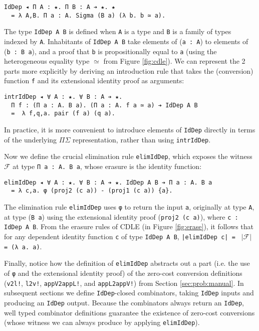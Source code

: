 \documentclass[acmsmall]{acmart}\settopmatter{}
\newcommand{\refsec}[1]{Section \ref{sec:#1}}
\newcommand{\reffig}[1]{Figure \ref{fig:#1}}
\begin{document}
\begin{verbatim}
IdDep ◂ Π A : ★. Π B : A ➔ ★. ★
  = λ A,B. Π a : A. Sigma (B a) (λ b. b ≃ a).
\end{verbatim}
The type \verb;IdDep A B; is defined when \verb;A; is a type and
\verb;B; is a family of types indexed by \verb;A;. Inhabitants of
\verb;IdDep A B; take elements of (\verb;a : A;) to elements of
(\verb;b : B a;), and a proof that \verb;b; is propositionally equal
to \verb;a; (using the heterogeneous equality type
$\simeq$
from \reffig{cdle}).
We can represent the 2 parts more explicitly by deriving
an introduction rule that takes the (conversion) function \verb;f; and
its extensional identity proof as arguments:

\begin{verbatim}
intrIdDep ◂ ∀ A : ★. ∀ B : A ➔ ★. 
  Π f : (Π a : A. B a). (Π a : A. f a ≃ a) ➔ IdDep A B 
  =  λ f,q,a. pair (f a) (q a).
\end{verbatim}
In practice, it is more convenient to introduce elements of
\verb;IdDep; directly in terms of the underlying $\Pi\Sigma$
representation, rather than using \verb;intrIdDep;.

Now we define the crucial elimination rule \verb;elimIdDep;, which exposes
the witness $\mathcal{F}$ at type \verb;Π a : A. B a;, whose erasure
is the identity function:

\begin{verbatim}
elimIdDep ◂ ∀ A : ★. ∀ B : A ➔ ★. IdDep A B ➔ Π a : A. B a
  = λ c,a. φ (proj2 (c a)) - (proj1 (c a)) {a}.
\end{verbatim}
The elimination rule \verb;elimIdDep; uses \verb;φ; to return the input
\verb;a;, originally at type \verb;A;, at type (\verb;B a;) using the
extensional identity proof (\verb;proj2 (c a);), where \verb;c : IdDep A B;.
From the erasure rules of CDLE (in \reffig{erase}), it follows
that for any dependent identity function \verb;c; of type \verb;IdDep A B;,
\verb;|elimIdDep c| = ; $|\mathcal{F}|$ \verb; = (λ a. a);.

Finally, notice how the definition of
\verb;elimIdDep; abstracts out a part (i.e. the use of \verb;φ; and the
extensional identity proof) of the zero-cost
conversion definitions (\verb;v2l!;, \verb;l2v!;, \verb;appV2appL!;, and
\verb;appL2appV!;) from \refsec{prob:manual}. In subsequent sections
we define \verb;IdDep;-closed combinators, taking \verb;IdDep; inputs
and producing an \verb;IdDep; output. Because the combinators always
return an \verb;IdDep;, well typed combinator definitions guarantee
the existence of zero-cost conversions
(whose witness we can always produce by applying \verb;elimIdDep;).
\end{document}
